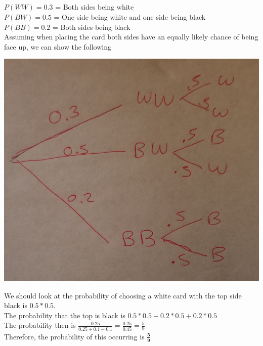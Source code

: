 \documentclass[10pt]{report}
\begin{document}
 \subsection{}
$P(WW) = 0.3 $ = Both sides being white \\
$P(BW) = 0.5 $ = One side being white and one side being black \\
$P(BB) = 0.2 $ = Both sides being black \\
Assuming when placing the card both sides have an equally likely chance of being face up, we can show the following \\
\begin{center}
\includegraphics[scale=0.5]{diagram.png}
\end{center}
We should look at the probability of choosing a white card with the top side black is $0.5*0.5 $. \\
The probability that the top is black is $0.5*0.5 + 0.2*0.5 + 0.2*0.5 $ \\
The probability then is $\frac{0.25}{0.25 + 0.1 + 0.1} = \frac{0.25}{0.45} = \frac{5}{9}$ \\
Therefore, the probability of this occurring is $\mathbf{\frac{5}{9}} $
\end{document}

